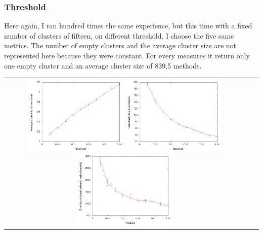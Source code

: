 \documentclass[12pt]{article}
\begin{document}
\subsubsection{Threshold}
\label{threshold}
Here again, I ran hundred times the same experience, but this time with a fixed number of clusters of fifteen, on different threshold. I choose the five same metrics. The number of empty clusters and the average cluster size are not represented here because they were constant. For every measures it return only one empty cluster and an average cluster size of 839,5 methods.
\begin{center}
\begin{tabular}{c c c}
\includegraphics[width=5cm]{images/taverageDist.png}
\includegraphics[width=5cm]{images/tquestionMark.png}
\includegraphics[width=5cm]{images/tswitch.png}
\end{tabular}
\end{center}
\end{document}
